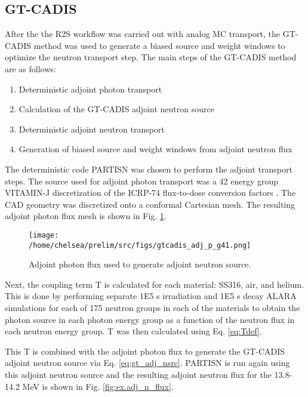 \subsection{GT-CADIS}\label{sec:gtcadis}
After the the R2S workflow was carried out with analog MC transport, the
GT-CADIS method was used to generate a biased source and weight windows 
to optimize the neutron transport step. 
The main steps of the GT-CADIS method are as follows:
\begin{enumerate}
	\item Deterministic adjoint photon transport
	\item Calculation of the GT-CADIS adjoint neutron source
	\item Deterministic adjoint neutron transport
	\item Generation of biased source and weight windows from adjoint neutron flux
\end{enumerate}

The deterministic code PARTISN \cite{partisn} was chosen to perform the adjoint transport
steps.  The source used for adjoint photon transport was a 42 energy group 
VITAMIN-J discretization of the ICRP-74 flux-to-dose conversion factors \cite{f2d}.  
The CAD geometry was discretized onto
a conformal Cartesian mesh.  The resulting adjoint photon flux mesh is shown in
Fig. \ref{fig:ex.adj_p_flux}.

\begin{figure}
	\texttt{[image: /home/chelsea/prelim/src/figs/gtcadis\_adj\_p\_g41.png]}
	\caption [GT-CADIS adjoint photon flux] 
	{Adjoint photon flux used to generate adjoint neutron source.\label{fig:ex.adj_p_flux}}
\end{figure}


Next, the coupling term T is calculated for each material: SS316, air, and
helium.  This is done by performing separate 1E5 s irradiation and 1E5 s decay
ALARA simulations for each of 175 neutron groups in each of the materials to 
obtain the photon source in each photon energy group as a function of the
neutron flux in each neutron energy group.  T was then calculated using 
Eq. \ref{eq:Tdef}.

This T is combined with the adjoint photon flux to generate the GT-CADIS
adjoint neutron source via Eq. \ref{eq:gt_adj_nsrc}. 
PARTISN is run again using this adjoint neutron source and the resulting
adjoint neutron flux for the 13.8-14.2 MeV is shown in Fig.
\ref{fig:ex.adj_n_flux}.

